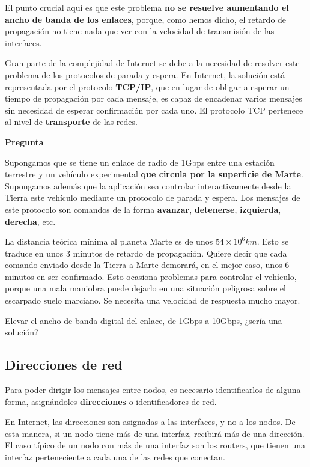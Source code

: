 \documentclass[spanish,a4paper,]{article}
\begin{document}
El punto crucial aquí es que este problema \textbf{no se resuelve
aumentando el ancho de banda de los enlaces}, porque, como hemos dicho,
el retardo de propagación no tiene nada que ver con la velocidad de
transmisión de las interfaces.

Gran parte de la complejidad de Internet se debe a la necesidad de
resolver este problema de los protocolos de parada y espera. En
Internet, la solución está representada por el protocolo
\textbf{TCP/IP}, que en lugar de obligar a esperar un tiempo de
propagación por cada mensaje, es capaz de encadenar varios mensajes sin
necesidad de esperar confirmación por cada uno. El protocolo TCP
pertenece al nivel de \textbf{transporte} de las redes.

\textbf{Pregunta}

Supongamos que se tiene un enlace de radio de 1Gbps entre una estación
terrestre y un vehículo experimental \textbf{que circula por la
superficie de Marte}. Supongamos además que la aplicación sea controlar
interactivamente desde la Tierra este vehículo mediante un protocolo de
parada y espera. Los mensajes de este protocolo son comandos de la forma
\textbf{avanzar}, \textbf{detenerse}, \textbf{izquierda},
\textbf{derecha}, etc.

La distancia teórica mínima al planeta Marte es de unos
\(54 \times 10^6 km\). Esto se traduce en unos 3 minutos de retardo de
propagación. Quiere decir que cada comando enviado desde la Tierra a
Marte demorará, en el mejor caso, unos 6 minutos en ser confirmado. Esto
ocasiona problemas para controlar el vehículo, porque una mala maniobra
puede dejarlo en una situación peligrosa sobre el escarpado suelo
marciano. Se necesita una velocidad de respuesta mucho mayor.

Elevar el ancho de banda digital del enlace, de 1Gbps a 10Gbps, ¿sería
una solución?

\hypertarget{direcciones-de-red}{%
\subsection{Direcciones de red}\label{direcciones-de-red}}

Para poder dirigir los mensajes entre nodos, es necesario identificarlos
de alguna forma, asignándoles \textbf{direcciones} o identificadores de
red.

En Internet, las direcciones son asignadas a las interfaces, y no a los
nodos. De esta manera, si un nodo tiene más de una interfaz, recibirá
más de una dirección. El caso típico de un nodo con más de una interfaz
son los routers, que tienen una interfaz perteneciente a cada una de las
redes que conectan.
\end{document}
